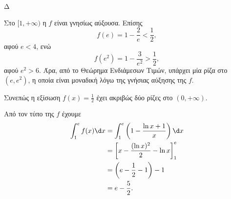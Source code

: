 \begin{thema}{Δ}
\begin{erwthma}
Στο $[1,+\infty)$ η $f$ είναι γνησίως αύξουσα. Επίσης
\[
f(e)=1-\frac{2}{e}<\frac{1}{2},
\]
αφού $e<4$, ενώ
\[
f(e^2)=1-\frac{3}{e^2}>\frac{1}{2},
\]
αφού $e^2>6$. Άρα, από το Θεώρημα Ενδιάμεσων Τιμών, υπάρχει μία ρίζα στο $(e,e^2)$, η οποία είναι μοναδική λόγω της γνήσιας αύξησης της $f$.

Συνεπώς η εξίσωση $f(x)=\frac{1}{2}$ έχει ακριβώς δύο ρίζες στο $(0,+\infty)$.

\item Από τον τύπο της $f$ έχουμε
\begin{align*}
\int_1^e f(x)\d x
&=\int_1^e\left(1-\frac{\ln x+1}{x}\right)\d x\\
&=\left[x-\frac{(\ln x)^2}{2}-\ln x\right]_1^e\\
&=\left(e-\frac{1}{2}-1\right)-1\\
&={e-\frac{5}{2}}.
\end{align*}
\end{erwthma}
\end{thema}

